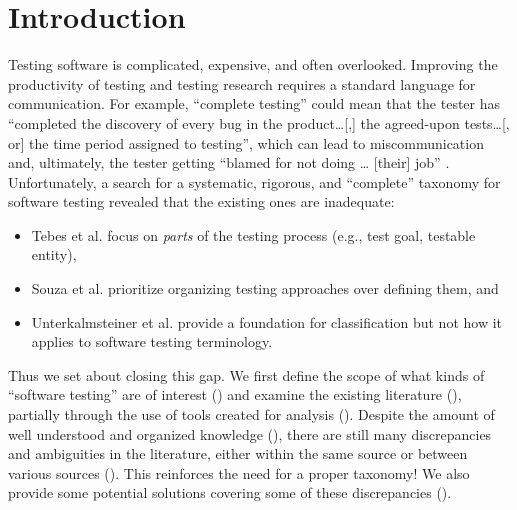 \section{Introduction}


Testing software is complicated, expensive, and often overlooked.
Improving the productivity of testing and testing research requires a standard
language for communication. For example, ``complete testing'' could mean that
the tester has ``completed the discovery of every bug in the product\dots[,] the
agreed-upon tests\dots[, or] the time period assigned to testing'', which can
lead to miscommunication and, ultimately, the tester getting ``blamed for not
doing \dots{} [their] job'' \citep[p.~7]{KanerEtAl2011}. Unfortunately, a search
for a systematic, rigorous, and ``complete'' taxonomy for software testing
revealed that the existing ones are inadequate:

\begin{itemize}
    \item \ifnotpaper\else Tebes et al. \fi\citet{TebesEtAl2020a} focus on
          \emph{parts} of the testing process (e.g., test goal, testable entity),
    \item \ifnotpaper\else Souza et al. \fi\citet{SouzaEtAl2017} prioritize
          organizing testing approaches over defining them, and
    \item \ifnotpaper\else Unterkalmsteiner et al. \fi\citet{UnterkalmsteinerEtAl2014}
          provide a foundation for classification but not how it applies to software
          testing terminology.
\end{itemize}

Thus we set about closing this gap. We first define the scope of what kinds of
``software testing'' are of interest () and examine the existing
literature ()\ifnotpaper, partially through the use of tools
created for analysis ()\fi. Despite the amount of well understood
and organized knowledge (), there are still many discrepancies and
ambiguities in the literature, either within the same source or between various
sources (). This reinforces the need for a proper taxonomy! We
also provide some potential solutions covering some of these discrepancies
().